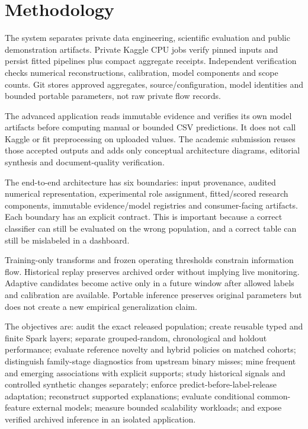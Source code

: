 \documentclass[conference]{IEEEtran}
\begin{document}
\section{Methodology}
The system separates private data engineering, scientific evaluation and public demonstration artifacts. Private Kaggle CPU jobs verify pinned inputs and persist fitted pipelines plus compact aggregate receipts. Independent verification checks numerical reconstructions, calibration, model components and scope counts. Git stores approved aggregates, source/configuration, model identities and bounded portable parameters, not raw private flow records.

The advanced application reads immutable evidence and verifies its own model artifacts before computing manual or bounded CSV predictions. It does not call Kaggle or fit preprocessing on uploaded values. The academic submission reuses those accepted outputs and adds only conceptual architecture diagrams, editorial synthesis and document-quality verification.

The end-to-end architecture has six boundaries: input provenance, audited numerical representation, experimental role assignment, fitted/scored research components, immutable evidence/model registries and consumer-facing artifacts. Each boundary has an explicit contract. This is important because a correct classifier can still be evaluated on the wrong population, and a correct table can still be mislabeled in a dashboard.

Training-only transforms and frozen operating thresholds constrain information flow. Historical replay preserves archived order without implying live monitoring. Adaptive candidates become active only in a future window after allowed labels and calibration are available. Portable inference preserves original parameters but does not create a new empirical generalization claim.

The objectives are: audit the exact released population; create reusable typed and finite Spark layers; separate grouped-random, chronological and holdout performance; evaluate reference novelty and hybrid policies on matched cohorts; distinguish family-stage diagnostics from upstream binary misses; mine frequent and emerging associations with explicit supports; study historical signals and controlled synthetic changes separately; enforce predict-before-label-release adaptation; reconstruct supported explanations; evaluate conditional common-feature external models; measure bounded scalability workloads; and expose verified archived inference in an isolated application.
\end{document}
